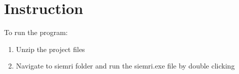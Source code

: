 \section{Instruction}

To run the program:

\begin{enumerate}
\item Unzip the project files
\item Navigate to siemri folder and run the siemri.exe file by double clicking
\end{enumerate}